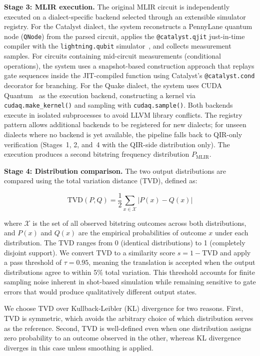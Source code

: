\documentclass[conference]{IEEEtran}
\begin{document}
\textbf{Stage 3: MLIR execution.} The original MLIR circuit is independently executed on a dialect-specific backend selected through an extensible simulator registry. For the Catalyst dialect, the system reconstructs a PennyLane quantum node (\texttt{QNode}) from the parsed circuit, applies the \texttt{@catalyst.qjit} just-in-time compiler with the \texttt{lightning.qubit} simulator~\cite{bergholm2022pennylane}, and collects measurement samples. For circuits containing mid-circuit measurements (conditional operations), the system uses a snapshot-based construction approach that replays gate sequences inside the JIT-compiled function using Catalyst's \texttt{@catalyst.cond} decorator for branching. For the Quake dialect, the system uses CUDA Quantum~\cite{kim2023cudaquantum} as the execution backend, constructing a kernel via \texttt{cudaq.make\_kernel()} and sampling with \texttt{cudaq.sample()}. Both backends execute in isolated subprocesses to avoid LLVM library conflicts. The registry pattern allows additional backends to be registered for new dialects; for unseen dialects where no backend is yet available, the pipeline falls back to QIR-only verification (Stages~1, 2, and~4 with the QIR-side distribution only). The execution produces a second bitstring frequency distribution $P_{\text{MLIR}}$.

\textbf{Stage 4: Distribution comparison.} The two output distributions are compared using the total variation distance (TVD), defined as:

\begin{equation}
\text{TVD}(P, Q) = \frac{1}{2} \sum_{x \in \mathcal{X}} |P(x) - Q(x)|
\label{eq:tvd}
\end{equation}

\noindent where $\mathcal{X}$ is the set of all observed bitstring outcomes across both distributions, and $P(x)$ and $Q(x)$ are the empirical probabilities of outcome $x$ under each distribution. The TVD ranges from 0 (identical distributions) to 1 (completely disjoint support). We convert TVD to a similarity score $s = 1 - \text{TVD}$ and apply a pass threshold of $\tau = 0.95$, meaning the translation is accepted when the output distributions agree to within 5\% total variation. This threshold accounts for finite sampling noise inherent in shot-based simulation while remaining sensitive to gate errors that would produce qualitatively different output states.

We choose TVD over Kullback-Leibler (KL) divergence for two reasons. First, TVD is symmetric, which avoids the arbitrary choice of which distribution serves as the reference. Second, TVD is well-defined even when one distribution assigns zero probability to an outcome observed in the other, whereas KL divergence diverges in this case unless smoothing is applied.
\end{document}
